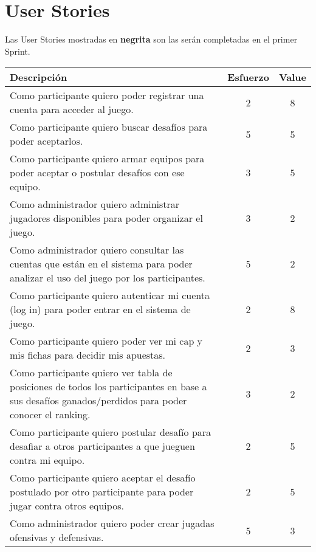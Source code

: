 \documentclass[11pt,a4paper]{article}
\begin{document}
\maketitle

\section*{User Stories}

Las User Stories mostradas en \textbf{negrita} son las ser\'an completadas en el primer Sprint.

\begin{table}[h]
\begin{tabularx}{\textwidth}{|X|c|c|}
\hline
\textbf{Descripci\'on} & \textbf{Esfuerzo} & \textbf{  Value  } \\ \hline
Como participante quiero poder registrar una cuenta para acceder al juego. & \Large2 & \Large8  \\ \hline
Como participante quiero buscar desafíos para poder aceptarlos. & \Large5 & \Large5 \\ \hline
Como participante quiero armar equipos para poder aceptar o postular desafíos con ese equipo. & \Large3 & \Large5 \\ \hline
Como administrador quiero administrar jugadores disponibles para poder organizar el juego. & \Large3 & \Large2 \\ \hline
Como administrador quiero consultar las cuentas que están en el sistema para poder analizar el uso del juego por los participantes. & \Large5 & \Large2\\ \hline
Como participante quiero autenticar mi cuenta (log in) para poder entrar en el sistema de juego. & \Large2 &\Large8 \\ \hline
Como participante quiero poder ver mi cap y mis fichas para decidir mis apuestas. &\Large2 &\Large3 \\ \hline
Como participante quiero ver tabla de posiciones de todos los participantes en base a sus desafíos ganados/perdidos para poder conocer el ranking. & \Large3 & \Large2\\ \hline
Como participante quiero postular desafío para desafiar a otros participantes a que jueguen contra mi equipo. & \Large2 & \Large5 \\ \hline
Como participante quiero aceptar el desafío postulado por otro participante para poder jugar contra otros equipos. & \Large2 & \Large5 \\ \hline
Como administrador quiero poder crear jugadas ofensivas y defensivas. &\Large5&\Large3 \\ \hline


\end{tabularx}
\end{table}
\end{document}
